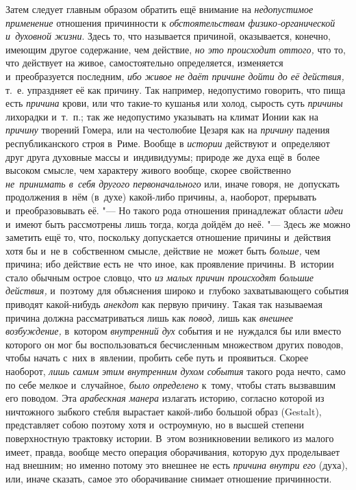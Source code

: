 Затем следует главным образом обратить ещё внимание на
{\em недопустимое применение} отношения причинности к
{\em обстоятельствам физико-органической и~духовной жизни}. Здесь то, что
называется причиной, оказывается, конечно, имеющим другое содержание, чем
действие, {\em но это происходит оттого,} что то, что действует на живое,
самостоятельно определяется, изменяется и~преобразуется последним,
{\em ибо живое не даёт причине дойти до её действия,} т.~е. упраздняет её как
причину. Так например, недопустимо говорить, что пища есть {\em причина} крови,
или что такие-то кушанья или холод, сырость суть {\em причины} лихорадки
и~т.~п.; так же недопустимо указывать на климат Ионии как на {\em причину}
творений Гомера, или на честолюбие Цезаря как на {\em причину} падения
республиканского строя в~Риме. Вообще в {\em истории} действуют и~определяют
друг друга духовные массы и~индивидуумы; природе же духа ещё в~более высоком
смысле, чем характеру живого вообще, скорее свойственно
{\em не~принимать в~себя другого первоначального} или, иначе говоря,
не~допускать продолжения в~нём (в~духе) какой-либо причины, а, наоборот,
прерывать и~преобразовывать её. "--- Но такого рода отношения принадлежат
области {\em идеи} и~имеют быть рассмотрены лишь тогда, когда дойдём до неё.
"--- Здесь же можно заметить ещё то, что, поскольку допускается отношение
причины и~действия хотя бы и~не в~собственном смысле, действие не~может быть
{\em больше,} чем причина; ибо действие есть не~что иное, как проявление
причины. В~истории стало обычным острое словцо, что {\em из малых причин
происходят большие действия,} и~поэтому для объяснения широко и~глубоко
захватывающего события приводят какой-нибудь {\em анекдот} как первую причину.
Такая так называемая причина должна рассматриваться лишь как {\em повод,} лишь
как {\em внешнее возбуждение,} в~котором {\em внутренний дух} события и
не~нуждался бы или вместо которого он мог бы воспользоваться бесчисленным
множеством других поводов, чтобы начать с~них в~явлении, пробить себе путь
и~проявиться. Скорее наоборот, {\em лишь самим этим внутренним духом события}
такого рода нечто, само по себе мелкое и~случайное, {\em было определено}
к~тому, чтобы стать вызвавшим его поводом. Эта {\em арабескная манера} излагать
историю, согласно которой из ничтожного зыбкого стебля вырастает какой-либо
большой образ (Gestalt), представляет собою поэтому хотя и~остроумную, но в
высшей степени поверхностную трактовку истории. В~этом возникновении великого
из малого имеет, правда, вообще место операция оборачивания, которую дух
проделывает над внешним; но именно потому это внешнее не есть
{\em причина внутри его} (духа), или, иначе сказать, самое это оборачивание
снимает отношение причинности.

